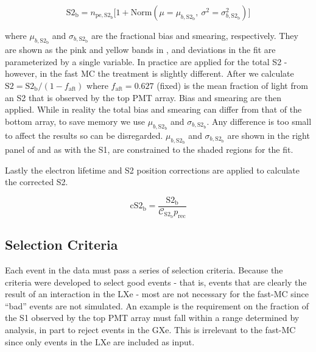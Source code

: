 \vspace{-10pt}

\begin{equation}
\mathrm{S2_b} = n_{\mathrm{pe,S2_b}} \Big[ 1 + \mathrm{Norm}(\mu = \mu_{b, \mathrm{S2_b}},\ \sigma^2 = \sigma_{b, \mathrm{S2_b}}^2) \Big]
\label{eq:er_nr_calibrations_parameter_determ_det_phys_s2_bias_smear}
\end{equation}

\noindent where $\mu_{b, \mathrm{S2_b}}$ and $\sigma_{b, \mathrm{S2_b}}$ are the \stwob fractional bias and smearing,
respectively.  They are shown as the pink and yellow bands in , and
deviations in the fit are parameterized by a single variable.  In
practice  are applied
for the total S2 - however, in the fast MC the treatment is slightly different.  After
 we calculate
$\mathrm{S2} = \mathrm{S2_b} / (1 - f_{\mathrm{aft}})$ where $f_{\mathrm{aft}} = 0.627$ (fixed) is the mean fraction of light from an
S2 that is observed by the top PMT array.  Bias and smearing are then applied.  While in reality the total bias and smearing
can differ from that of the bottom array, to save memory we use $\mu_{b, \mathrm{S2_b}}$ and $\sigma_{b, \mathrm{S2_b}}$.  Any
difference is too small to affect the results so can be disregarded.  $\mu_{b, \mathrm{S2_b}}$ and $\sigma_{b, \mathrm{S2_b}}$ are shown
in the right panel of  and as with the S1, are constrained to the
shaded regions for the fit.

Lastly the electron lifetime and S2 position corrections are applied to calculate the corrected S2.

\vspace{-10pt}

\begin{equation}
\mathrm{cS2_b} = \frac{\mathrm{S2_b}}{\mathcal{C}_{\mathrm{S2_b}} p_{\mathrm{rec}}}
\end{equation}



\subsection{Selection Criteria}
\label{subsec:er_nr_calibrations_parameter_determ_cuts}
Each event in the data must pass a series of selection criteria.  Because the criteria were developed to select good events - that is,
events that are
clearly the result of an interaction in the LXe - most are not necessary for the fast-MC since ``bad'' events are not simulated.  An
example is the requirement on the fraction of the S1 observed by the top PMT array must fall within a range determined by analysis, in
part to reject events in the GXe.  This is irrelevant to the fast-MC since only events in the LXe are included as input.

